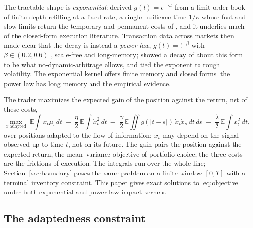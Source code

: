 \documentclass[11pt]{article}
\newcommand{\E}{\mathbb{E}}
\theoremstyle{plain}
\theoremstyle{definition}
\theoremstyle{remark}
\begin{document}
The tractable shape is \emph{exponential}: \citet{ObizhaevaWang2013} derived $g(t)=e^{-\kappa t}$ from a limit order book of finite depth refilling at a fixed rate, a single resilience time $1/\kappa$ whose fast and slow limits return the temporary and permanent costs of \citet{AlmgrenChriss2001}, and it underlies much of the closed-form execution literature. Transaction data across markets then made clear that the decay is instead a \emph{power law}, $g(t)=t^{-\beta}$ with $\beta\in(0.2,0.6)$ \citep{BouchaudGefenPottersWyart2004,JusselinRosenbaum2020}, scale-free and long-memory; \citet{Gatheral2010} showed a decay of about this form to be what no-dynamic-arbitrage allows, and \citet{JusselinRosenbaum2020} tied the exponent to rough volatility. The exponential kernel offers finite memory and closed forms; the power law has long memory and the empirical evidence.

The trader maximizes the expected gain of the position against the return, net of these costs,
\begin{equation}\label{eq:objective}
\max_{x\ \text{adapted}}\ \E\!\int x_t\mu_t\,dt
\;-\; \frac{\eta}{2}\,\E\!\int \dot x_t^2\,dt
\;-\; \frac{\gamma}{2}\,\E\!\iint g(|t-s|)\,\dot x_t \dot x_s\,dt\,ds
\;-\; \frac{\lambda}{2}\,\E\!\int x_t^2\,dt ,
\end{equation}
over positions adapted to the flow of information: $x_t$ may depend on the signal observed up to time $t$, not on its future. The gain pairs the position against the expected return, the mean--variance objective of portfolio choice; the three costs are the frictions of execution. The integrals run over the whole line; Section~\ref{sec:boundary} poses the same problem on a finite window $[0,T]$ with a terminal inventory constraint. This paper gives exact solutions to \eqref{eq:objective} under both exponential and power-law impact kernels.

\subsection{The adaptedness constraint}\label{sec:adaptedness}
\end{document}
